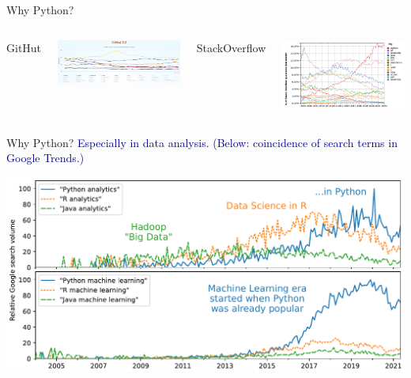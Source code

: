 \documentclass[aspectratio=169]{beamer}
\begin{document}
\begin{frame}{Why Python?}
\vspace{0.25 cm}
\begin{columns}[t]
\centering GitHut

\vspace{0.1 cm}
\includegraphics[width=\linewidth]{python-rankings-githut-2022.png}

\centering StackOverflow

\vspace{0.1 cm}
\includegraphics[width=\linewidth]{python-rankings-stackoverflow-2022.png}
\end{columns}
\end{frame}

\begin{frame}{Why Python?}
\large
\vspace{0.25 cm}
\textcolor{darkblue}{\mbox{\hspace{-0.5 cm}}Especially in data analysis. (Below: coincidence of search terms in Google Trends.)}

\vspace{0.15 cm}
\includegraphics[width=\linewidth]{analytics-by-language.pdf}
\end{frame}
\end{document}
